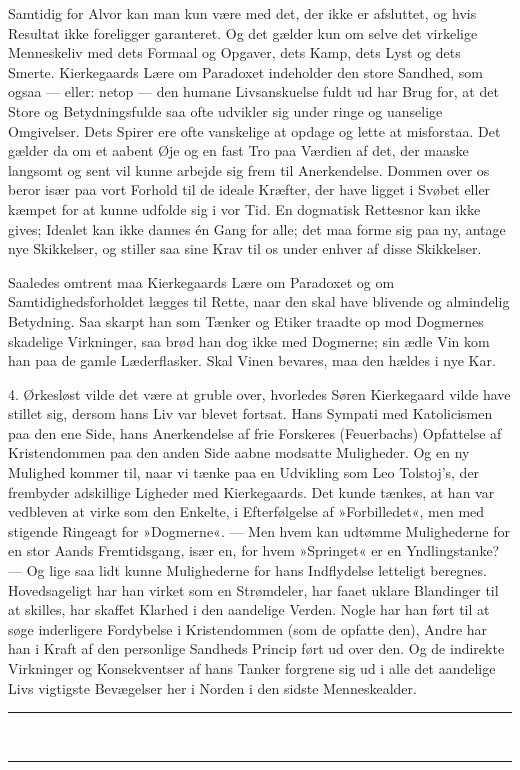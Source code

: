 \documentclass[12pt,a4paper,openany]{book}
\newcommand{\opage}[1]{\marginnote{\footnotesize\textit{[#1]}}}
\begin{document}
Samtidig for Alvor kan man kun være med det, der
ikke er afsluttet, og hvis Resultat ikke foreligger garanteret.
Og det gælder kun om selve det virkelige Menneskeliv
med dets Formaal og Opgaver, dets Kamp, dets
Lyst og dets Smerte. Kierkegaards Lære om Paradoxet
indeholder den store Sandhed, som ogsaa --- eller: netop
--- den humane Livsanskuelse fuldt ud har Brug for, at
det Store og Betydningsfulde saa ofte udvikler sig under
ringe og uanselige Omgivelser. Dets Spirer ere ofte
vanskelige at opdage og lette at misforstaa. Det gælder
da om et aabent Øje og en fast Tro paa Værdien af det,
der maaske langsomt og sent vil kunne arbejde sig frem
til Anerkendelse. Dommen over os beror især paa vort
Forhold til de ideale Kræfter, der have ligget i Svøbet
eller kæmpet for at kunne udfolde sig i vor Tid. En
dogmatisk Rettesnor kan ikke gives; Idealet kan ikke
dannes én Gang for alle; det maa forme sig paa ny,
antage nye Skikkelser, og stiller saa sine Krav til os
under enhver af disse Skikkelser.

Saaledes omtrent maa Kierkegaards Lære om Paradoxet
og om Samtidighedsforholdet lægges til Rette, naar
den skal have blivende og almindelig Betydning. Saa
skarpt han som Tænker og Etiker traadte op mod Dogmernes
skadelige Virkninger, saa brød han dog ikke med
Dogmerne; sin ædle Vin kom han paa de gamle Læderflasker.
Skal Vinen bevares, maa den hældes i nye Kar.

4. Ørkesløst vilde det være at gruble over, hvorledes
Søren Kierkegaard vilde have stillet sig, dersom
hans Liv var blevet fortsat. Hans Sympati med Katolicismen
paa den ene Side, hans Anerkendelse af frie Forskeres
(Feuerbachs) Opfattelse af Kristendommen paa den
\opage{159}anden Side aabne modsatte Muligheder. Og en ny Mulighed
kommer til, naar vi tænke paa en Udvikling som
Leo Tolstoj's, der frembyder adskillige Ligheder med
Kierkegaards. Det kunde tænkes, at han var vedbleven
at virke som den Enkelte, i Efterfølgelse af »Forbilledet«,
men med stigende Ringeagt for »Dogmerne«. --- Men
hvem kan udtømme Mulighederne for en stor Aands
Fremtidsgang, især en, for hvem »Springet« er en Yndlingstanke?
--- Og lige saa lidt kunne Mulighederne for
hans Indflydelse letteligt beregnes. Hovedsageligt har
han virket som en Strømdeler, har faaet uklare Blandinger
til at skilles, har skaffet Klarhed i den aandelige Verden.
Nogle har han ført til at søge inderligere Fordybelse i
Kristendommen (som de opfatte den), Andre har han i
Kraft af den personlige Sandheds Princip ført ud over
den. Og de indirekte Virkninger og Konsekventser af
hans Tanker forgrene sig ud i alle det aandelige Livs
vigtigste Bevægelser her i Norden i den sidste Menneskealder.
\begin{center}\rule{2cm}{0.4pt}\\[-8pt]\rule{2cm}{0.4pt}\end{center}
\end{document}
